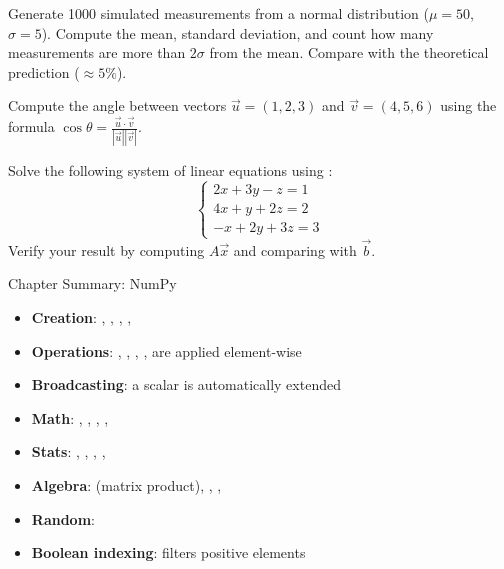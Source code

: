 \begin{exercise}
Generate 1000 simulated measurements from a normal distribution ($\mu = 50$, $\sigma = 5$).
Compute the mean, standard deviation, and count how many measurements are more than
$2\sigma$ from the mean. Compare with the theoretical prediction ($\approx 5\%$).
\end{exercise}

\begin{exercise}
Compute the angle between vectors $\vec{u} = (1, 2, 3)$ and $\vec{v} = (4, 5, 6)$
using the formula $\cos\theta = \frac{\vec{u}\cdot\vec{v}}{|\vec{u}||\vec{v}|}$.
\end{exercise}

\begin{exercise}
Solve the following system of linear equations using :
\[
\begin{cases}
2x + 3y - z = 1 \\
4x + y + 2z = 2 \\
-x + 2y + 3z = 3
\end{cases}
\]
Verify your result by computing $A\vec{x}$ and comparing with $\vec{b}$.
\end{exercise}

\begin{keyformulas}{Chapter Summary: NumPy}
\begin{itemize}
    \item \textbf{Creation}: , , ,
    , 
    \item \textbf{Operations}: \py{+}, \py{-}, \py{*}, \py{/}, \py{**}
    are applied element-wise
    \item \textbf{Broadcasting}: a scalar is automatically extended
    \item \textbf{Math}: , , , , 
    \item \textbf{Stats}: , , , , 
    \item \textbf{Algebra}:  (matrix product), ,
    , 
    \item \textbf{Random}: 
    \item \textbf{Boolean indexing}:  filters positive elements
\end{itemize}
\end{keyformulas}
